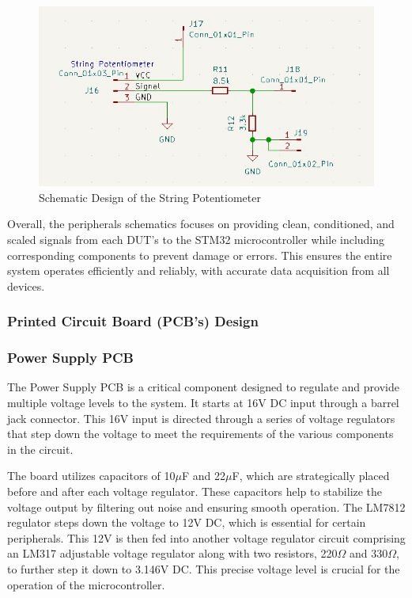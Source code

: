 \documentclass[12pt]{article}
\begin{document}
\begin{figure}[H]
  \includegraphics[width=\textwidth]{../assets/pcb/image5.jpg}
  \caption{Schematic Design of the String Potentiometer}
\end{figure}

Overall, the peripherals schematics focuses on providing clean, conditioned, and scaled signals from each DUT’s to the STM32 microcontroller while including corresponding components to prevent damage or errors. This ensures the entire system operates efficiently and reliably, with accurate data acquisition from all devices.

\subsubsection{Printed Circuit Board (PCB’s) Design}
\subsubsection*{Power Supply PCB}
The Power Supply PCB is a critical component designed to regulate and provide
multiple voltage levels to the system. It starts at 16V DC input through a
barrel jack connector. This 16V input is directed through a series of voltage
regulators that step down the voltage to meet the requirements of the various
components in the circuit.

The board utilizes capacitors of 10$\mu$F and 22$\mu$F, which are strategically placed
before and after each voltage regulator. These capacitors help to stabilize the
voltage output by filtering out noise and ensuring smooth operation. The LM7812
regulator steps down the voltage to 12V DC, which is essential for certain
peripherals. This 12V is then fed into another voltage regulator circuit
comprising an LM317 adjustable voltage regulator along with two resistors, 220$\Omega$
and 330$\Omega$, to further step it down to 3.146V DC. This precise voltage level is
crucial for the operation of the microcontroller.
\end{document}
